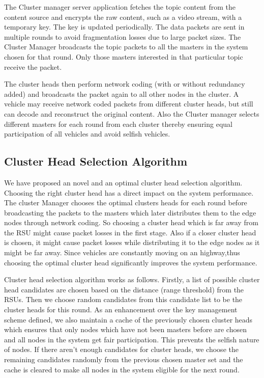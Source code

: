 \documentclass{acm_proc_article-sp}
\begin{document}
The Cluster manager server application fetches the topic content from the content source and encrypts the raw content, such as a video stream, with a temporary key. The key is updated periodically. The data packets are sent in multiple rounds to avoid fragmentation losses due to large packet sizes. The Cluster Manager broadcasts the topic packets to all the masters in the system chosen for that round. Only those masters interested in that particular topic receive the packet. 

The cluster heads then perform network coding (with or without redundancy added) and broadcasts the packet again to all other nodes in the cluster. A vehicle may receive network coded packets from different cluster heads, but still can decode and reconstruct the original content. Also the Cluster manager selects different masters for each round from each cluster thereby ensuring equal participation of all vehicles and avoid selfish vehicles. 
 
\subsection{Cluster Head Selection Algorithm}
\vspace{1 mm}
We have proposed an novel and an optimal cluster head selection algorithm. Choosing the right cluster head has a direct impact on the system performance. The cluster Manager chooses the optimal clusters heads for each round before broadcasting the packets to the masters which later distributes them to the edge nodes through network coding. So choosing a cluster head which is far away from the RSU might cause packet losses in the first stage. Also if a closer cluster head is chosen, it might cause packet losses while distributing it to the edge nodes as it might be far away. Since vehicles are constantly moving on an highway,thus choosing the optimal cluster head significantly improves the system performance. 

Cluster head selection algorithm works as follows. Firstly, a list of possible cluster head candidates are chosen based on the distance (range threshold) from the RSUs. Then we choose random candidates from this candidate list to be the cluster heads for this round. As an enhancement over the key management scheme defined, we also maintain a cache of the previously chosen cluster heads which ensures that only nodes which have not been masters before are chosen and all nodes in the system get fair participation. This prevents the selfish nature of nodes. If there aren't enough candidates for cluster heads, we choose the remaining candidates randomly from the previous chosen master set and the cache is cleared to make all nodes in the system eligible for the next round. 
\end{document}

